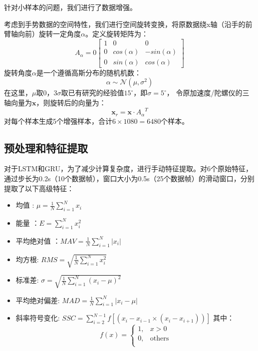针对小样本的问题，我们进行了数据增强。

考虑到手势数据的空间特性，我们进行空间旋转变换，将原数据绕x轴（沿手的前臂轴向前）旋转一定角度$\alpha$。定义旋转矩阵为：
$$
A_{\alpha} = 0
\begin{bmatrix}
  1 & 0 & 0\\
  0 & cos(\alpha) & -sin(\alpha)\\
  0& sin(\alpha) & cos(\alpha)
\end{bmatrix}
$$
旋转角度$\alpha$是一个遵循高斯分布的随机机数：
$$
\alpha \sim \mathcal{N}(\mu, \sigma^2)
$$
在这里，$\mu$取0，$3\sigma$取已有研究的经验值$15^\circ$\cite{d2020transformer}，即$\sigma=5^\circ$，
令原加速度/陀螺仪的三轴向量为$\bm{x}$，则旋转后的向量为：
$$
\bm{x}_r = \bm{x} \cdot {A_{\alpha}}^T
$$
对每个样本生成5个增强样本，合计$6 \times 1080 = 6480$个样本。

\subsection{预处理和特征提取}\label{ssec:feature_ext}


对于LSTM和GRU，为了减少计算复杂度，进行手动特征提取。对6个原始特征，通过步长为0.2s（10个数据帧），窗口大小为0.5s（25个数据帧）的滑动窗口，分别提取了以下高级特征：
\begin{itemize}
    \item 均值 : $\mu = \frac{1}{N}\sum_{i=1}^{N}x_i$
    \item 能量 ：$E = \sum_{i=1}^{N}x_i^2$
    \item 平均绝对值 ：$MAV = \frac{1}{N}\sum_{i=1}^{N}|x_i|$
    \item 均方根: $RMS = \sqrt{\frac{1}{N}\sum_{i=1}^{N}x_i^2}$
    \item 标准差: $\sigma =\sqrt{\frac{1}{N}\sum_{i=1}^{N}(x_i-\mu)^2}$
    \item 平均绝对偏差: $MAD=\frac{1}{N}\sum_{i=1}^{N}|x_i-\mu|$
    \item 斜率符号变化: $SSC = \sum_{i=2}^{N-1}f[(x_i-x_{i-1}\times (x_i-x_{i+1}))]$
    其中：
$$f(x) = 
\begin{cases} 
1,  & x > 0 \\
0,  & \text{others}\\
\end{cases}
$$
\end{itemize}

